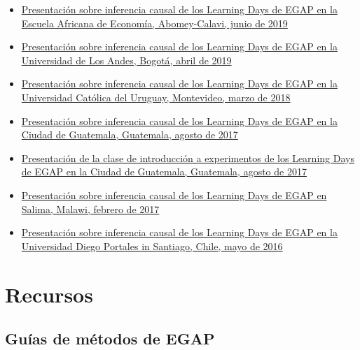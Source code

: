 \documentclass[
  12pt,
  spanish,
]{book}
\begin{document}
\begin{itemize}
\item
  \href{https://egap.github.io/learningdays-resources/Slides/Examples/causality-benin.pdf}{Presentación sobre inferencia causal de los Learning Days de EGAP en la Escuela Africana de Economía, Abomey-Calavi, junio de 2019}
\item
  \href{https://egap.github.io/learningdays-resources/Slides/Examples/causality-bogota.pdf}{Presentación sobre inferencia causal de los Learning Days de EGAP en la Universidad de Los Andes, Bogotá, abril de 2019}
\item
  \href{https://egap.github.io/learningdays-resources/Slides/Examples/causality-montevideo.pdf}{Presentación sobre inferencia causal de los Learning Days de EGAP en la Universidad Católica del Uruguay, Montevideo, marzo de 2018}
\item
  \href{https://egap.github.io/learningdays-resources/Slides/Examples/causality-guatemala.pdf}{Presentación sobre inferencia causal de los Learning Days de EGAP en la Ciudad de Guatemala, Guatemala, agosto de 2017}
\item
  \href{https://egap.github.io/learningdays-resources/Slides/Examples/intro_experiments-guatemala.pdf}{Presentación de la clase de introducción a experimentos de los Learning Days de EGAP en la Ciudad de Guatemala, Guatemala, agosto de 2017}
\item
  \href{https://egap.github.io/learningdays-resources/Slides/Examples/causality-malawi.pdf}{Presentación sobre inferencia causal de los Learning Days de EGAP en Salima, Malawi, febrero de 2017}
\item
  \href{https://egap.github.io/learningdays-resources/Slides/Examples/causality-santiago.pdf}{Presentación sobre inferencia causal de los Learning Days de EGAP en la Universidad Diego Portales in Santiago, Chile, mayo de 2016}
\end{itemize}

\hypertarget{recursos-1}{%
\section{Recursos}\label{recursos-1}}

\hypertarget{guuxedas-de-muxe9todos-de-egap}{%
\subsection{Guías de métodos de EGAP}\label{guuxedas-de-muxe9todos-de-egap}}
\end{document}
